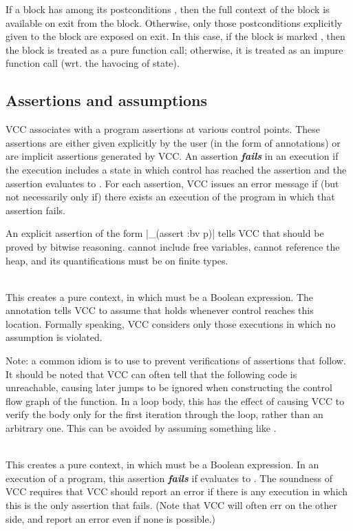 \documentclass[preprint,nocopyrightspace]{sigplanconf}
\newcommand{\Def}[1]{\textit{\textbf{#1}}}
\begin{document}
{{{If a block has among its
postconditions , then the full context
of the block is available on exit from the block. Otherwise, only
those postconditions explicitly given to the block are exposed on
exit. In this case, if the block is marked , then the
block is treated as a pure function call; otherwise, it is treated as
an impure function call (wrt. the havocing of state). 

\subsection{Assertions and assumptions}
VCC associates with a program assertions at various control
points. These assertions are either given explicitly by the user (in
the form of  annotations) or are implicit assertions
generated by VCC. An assertion \Def{fails} in an execution if the
execution includes a state in which control has reached the assertion
and the assertion evaluates to . For each assertion, VCC issues an
error message if (but not necessarily only if) there exists an
execution of the program in which that assertion fails.

An explicit assertion of the form \vcc|_(assert {:bv} p)|
tells VCC that  should be proved by bitwise reasoning. 
cannot include free variables, cannot reference the heap, and its
quantifications must be on finite types.

\\
This creates a pure context, in which  must be a Boolean
expression. The annotation tells VCC to assume that  holds
whenever control reaches this location. Formally speaking, VCC
considers only those executions in which no assumption is violated.

Note: a common idiom is to use  to prevent
verifications of assertions that follow. It should be noted that VCC
can often tell that the following code is unreachable, causing later
jumps to be ignored when constructing the control flow graph of the
function. In a loop body, this has the effect of causing VCC to verify
the body only for the first iteration through the loop, rather than an
arbitrary one. This can be avoided by assuming something like 
.

\\
This creates a pure context, in which  must be a Boolean
expression. In an execution of a program, this assertion \Def{fails}
if  evaluates to . The soundness of VCC requires that
VCC should report an error if there is any execution in which this is
the only assertion that fails. (Note that VCC will often err on the
other side, and report an error even if none is possible.)

}}}
\end{document}
